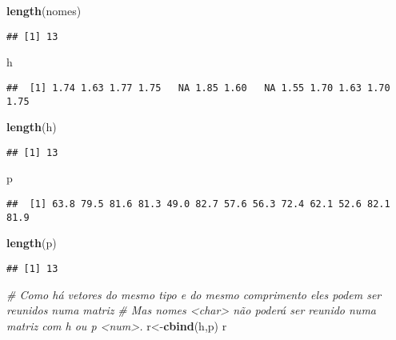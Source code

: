 \documentclass[]{article}
\newenvironment{Shaded}{\begin{snugshade}}{\end{snugshade}}
\newcommand{\KeywordTok}[1]{\textcolor[rgb]{0.13,0.29,0.53}{\textbf{#1}}}
\newcommand{\CommentTok}[1]{\textcolor[rgb]{0.56,0.35,0.01}{\textit{#1}}}
\newcommand{\NormalTok}[1]{#1}
\begin{document}
\begin{Shaded}
\begin{Highlighting}[]
\KeywordTok{length}\NormalTok{(nomes)}
\end{Highlighting}
\end{Shaded}

\begin{verbatim}
## [1] 13
\end{verbatim}

\begin{Shaded}
\begin{Highlighting}[]
\NormalTok{h}
\end{Highlighting}
\end{Shaded}

\begin{verbatim}
##  [1] 1.74 1.63 1.77 1.75   NA 1.85 1.60   NA 1.55 1.70 1.63 1.70 1.75
\end{verbatim}

\begin{Shaded}
\begin{Highlighting}[]
\KeywordTok{length}\NormalTok{(h)}
\end{Highlighting}
\end{Shaded}

\begin{verbatim}
## [1] 13
\end{verbatim}

\begin{Shaded}
\begin{Highlighting}[]
\NormalTok{p}
\end{Highlighting}
\end{Shaded}

\begin{verbatim}
##  [1] 63.8 79.5 81.6 81.3 49.0 82.7 57.6 56.3 72.4 62.1 52.6 82.1 81.9
\end{verbatim}

\begin{Shaded}
\begin{Highlighting}[]
\KeywordTok{length}\NormalTok{(p)}
\end{Highlighting}
\end{Shaded}

\begin{verbatim}
## [1] 13
\end{verbatim}

\begin{Shaded}
\begin{Highlighting}[]
\CommentTok{# Como há vetores do mesmo tipo e do mesmo comprimento eles podem ser reunidos numa matriz}
\CommentTok{# Mas nomes <char> não poderá ser reunido numa matriz com h ou p <num>.}
\NormalTok{r<-}\KeywordTok{cbind}\NormalTok{(h,p)}
\NormalTok{r}
\end{Highlighting}
\end{Shaded}
\end{document}

